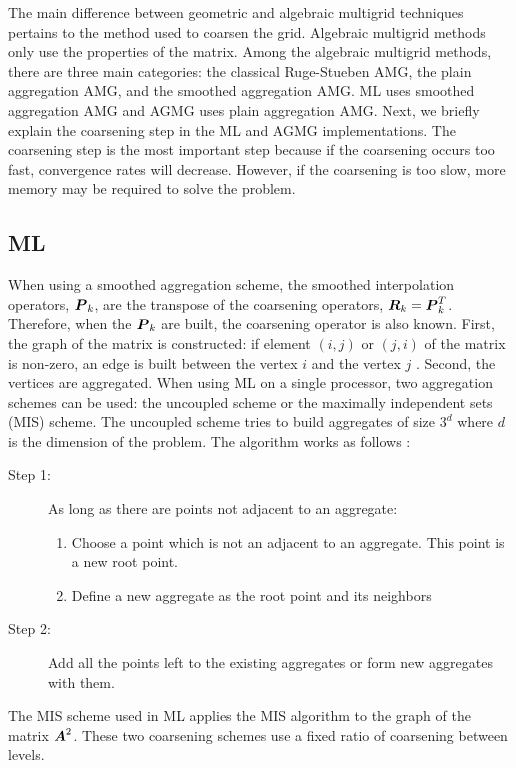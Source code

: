 {The main difference between geometric and algebraic multigrid techniques
pertains to the method used
to coarsen the grid. Algebraic multigrid methods only use the properties of the
matrix. Among the algebraic multigrid methods, there are three main categories: 
the classical Ruge-Stueben AMG, the plain aggregation AMG, and the
smoothed aggregation AMG. ML uses smoothed aggregation AMG and AGMG
uses plain aggregation AMG. Next, we briefly explain the coarsening step in
the ML and AGMG implementations. The coarsening step is the most important 
step because if the coarsening occurs too fast, convergence rates will 
decrease. However, if the coarsening is too slow, more memory may be 
required to solve the problem. 

\subsection{ML}
When using a smoothed aggregation scheme, the smoothed interpolation operators,
$\boldsymbol{P}_k$, are the transpose of the coarsening operators,
$\boldsymbol{R}_k=\boldsymbol{P}_k^T$. Therefore, when the $\boldsymbol{P}_k$ are built, the
coarsening operator is also known. First, the graph of the matrix is
constructed: if element $(i,j)$ or $(j,i)$ of the matrix is non-zero, an edge
is built between the vertex $i$ and the vertex $j$ \cite{ml_guide}. Second,
the vertices are 
aggregated. When using ML on a single processor, two aggregation schemes can
be used: the uncoupled scheme or the maximally independent sets (MIS) scheme. 
The uncoupled scheme tries to build aggregates of size $3^d$ where $d$ is the
dimension of the problem. The algorithm works as follows \cite{mis}:
\begin{description}
  \item[Step 1:] As long as there are points not adjacent to an aggregate:
    \begin{enumerate}
      \item Choose a point which is not an adjacent to an
        aggregate. This point is a new root point.
      \item Define a new aggregate as the root point and its neighbors 
    \end{enumerate}
  \item[Step 2:] Add all the points left to the existing aggregates or form 
    new aggregates with them.
\end{description}
The MIS scheme used in ML applies the MIS algorithm \cite{graph_coloring} to
the graph of the matrix $\boldsymbol{A}^2$. These two coarsening 
schemes use a fixed ratio of coarsening between levels. 

}
